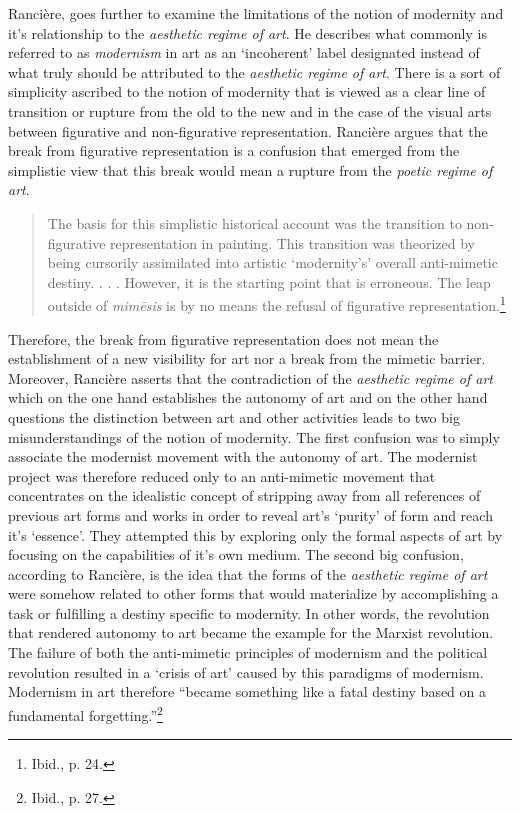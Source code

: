 Ranci\`{e}re, goes further to examine the limitations of the notion of modernity and it's relationship to the \emph{aesthetic regime of art}. He describes what commonly is referred to as \emph{modernism} in art as an `incoherent' label designated instead of what truly should be attributed to the \emph{aesthetic regime of art}. There is a sort of simplicity ascribed to the notion of modernity that is viewed as a clear line of transition or rupture from the old to the new and in the case of the visual arts between figurative and non-figurative representation. Ranci\`{e}re argues that the break from figurative representation is a confusion that emerged from the simplistic view that this break would mean a rupture from the \emph{poetic regime of art}.

\begin{quote}
The basis for this simplistic historical account was the transition to non-figurative representation in painting. This transition was theorized by being cursorily assimilated into artistic `modernity's' overall anti-mimetic destiny. . . . However, it is the starting point that is erroneous. The leap outside of \emph{mim\={e}sis} is by no means the refusal of figurative representation.\footnote{Ibid., p. 24.}
\end{quote}

Therefore, the break from figurative representation does not mean the establishment of a new visibility for art nor a break from the mimetic barrier. Moreover, Ranci\`{e}re asserts that the contradiction of the \emph{aesthetic regime of art} which on the one hand establishes the autonomy of art and on the other hand questions the distinction between art and other activities leads to two big misunderstandings of the notion of modernity. The first confusion was to simply associate the modernist movement with the autonomy of art. The modernist project was therefore reduced only to an anti-mimetic movement that concentrates on the idealistic concept of stripping away from all references of previous art forms and works in order to reveal art's `purity' of form and reach it's `essence'. They attempted this by exploring only the formal aspects of art by focusing on the capabilities of it's own medium. The second big confusion, according to Ranci\`{e}re, is the idea that the forms of the \emph{aesthetic regime of art} were somehow related to other forms that would materialize by accomplishing a task or fulfilling a destiny specific to modernity. In other words, the revolution that rendered autonomy to art became the example for the Marxist revolution. The failure of both the anti-mimetic principles of modernism and the political revolution resulted in a `crisis of art' caused by this paradigms of modernism. Modernism in art therefore ``became something like a fatal destiny based on a fundamental forgetting.''\footnote{Ibid., p. 27.} 

